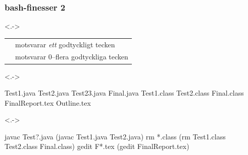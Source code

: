 \begin{frame}[fragile,t]
    \frametitle{bash-finesser 2}

    \blankline
    \begin{onlyenv}<.->
        \begin{tabular}{ll}
            \code{?} & motsvarar \emph{ett} godtyckligt tecken \\
            \code{*} & motsvarar 0--flera godtyckliga tecken   \\
        \end{tabular}
    \end{onlyenv}

    \blankline
    \begin{onlyenv}<.->
        \begin{GobbleCode}{8}
            Test1.java  Test2.java  Test23.java  Final.java
            Test1.class Test2.class Final.class  FinalReport.tex
            Outline.tex
        \end{GobbleCode}
    \end{onlyenv}

    \begin{onlyenv}<.->
        \begin{GobbleCode}{8}
            javac Test?.java (javac Test1.java Test2.java)
            rm *.class       (rm Test1.class Test2.class Final.class)
            gedit F*.tex     (gedit FinalReport.tex)
        \end{GobbleCode}
    \end{onlyenv}

\end{frame}




